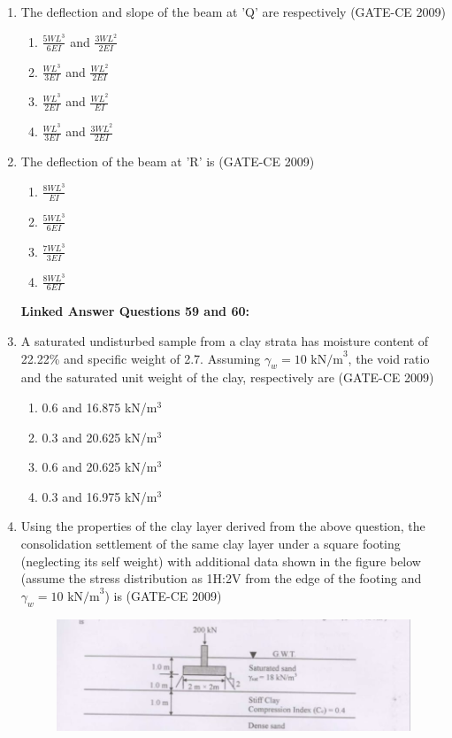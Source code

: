 \documentclass[journal,12pt,onecolumn]{article}
\theoremstyle{remark}
\begin{document}
\begin{enumerate}
    \item The deflection and slope of the beam at 'Q' are respectively (GATE-CE 2009)
    \begin{enumerate}
        \item $\frac{5WL^3}{6EI}$ and $\frac{3WL^2}{2EI}$ 
        \item $\frac{WL^3}{3EI}$ and $\frac{WL^2}{2EI}$ 
        \item $\frac{WL^3}{2EI}$ and $\frac{WL^2}{EI}$ 
        \item $\frac{WL^3}{3EI}$ and $\frac{3WL^2}{2EI}$
    \end{enumerate}
    
    \item The deflection of the beam at 'R' is (GATE-CE 2009)
    \begin{multicols}{4}
    \begin{enumerate}
        \item $\frac{8WL^3}{EI}$ 
        \item $\frac{5WL^3}{6EI}$ 
        \item $\frac{7WL^3}{3EI}$ 
        \item $\frac{8WL^3}{6EI}$
    \end{enumerate}
\end{multicols}
    
\textbf{Linked Answer Questions 59 and 60:}
    \item A saturated undisturbed sample from a clay strata has moisture content of 22.22\% and specific weight of 2.7. Assuming $\gamma_w = 10 \text{ kN/m}^3$, the void ratio and the saturated unit weight of the clay, respectively are (GATE-CE 2009)
    \begin{enumerate}
        \item 0.6 and 16.875 kN/m$^3$ 
        \item 0.3 and 20.625 kN/m$^3$ 
        \item 0.6 and 20.625 kN/m$^3$ 
        \item 0.3 and 16.975 kN/m$^3$
    \end{enumerate}
    
    \item Using the properties of the clay layer derived from the above question, the consolidation settlement of the same clay layer under a square footing (neglecting its self weight) with additional data shown in the figure below (assume the stress distribution as 1H:2V from the edge of the footing and $\gamma_w = 10 \text{ kN/m}^3$) is (GATE-CE 2009)
    \begin{figure}[H]
    \centering
    \includegraphics[width=0.7\columnwidth]{figs/image7.jpg}
    \caption{}
    \label{fig:placeholder}
    \end{figure}
    

\end{enumerate}
\end{document}
